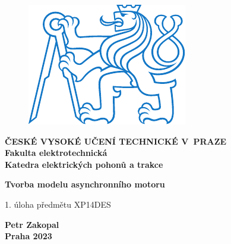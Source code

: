 \documentclass[a4paper, twoside, 11pt]{article}
\begin{document}
\setcounter{figure}{0}

\begin{titlepage}
	\begin{center}

\begin{figure}[H]
	\begin{center}
		\includegraphics[scale=1]{src/misc/symbol_cvut_konturova_verze.pdf}
	\end{center}
\end{figure}
	{\Large{\textbf{ČESKÉ VYSOKÉ UČENÍ TECHNICKÉ V~PRAZE}}}\\
	{\textbf{Fakulta elektrotechnická}}\\
	{\textbf{Katedra elektrických pohonů a trakce}}
	
	\vspace{3cm}
	
	
	{\Large\textbf{Tvorba modelu asynchronního motoru}}
	
	\vspace{1cm}
	
	
	
	1. úloha předmětu XP14DES\\
	
	\end{center}
	
	\vspace{3cm}
	
	
	\vspace{0.5cm}
	
	\vfill
	
\begin{center}

	\large{\textbf{Petr Zakopal}}\\
	\large{\textbf{Praha 2023}}
	\end{center}
\end{titlepage}
\end{document}
